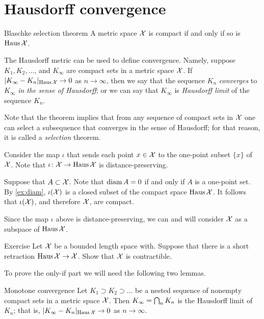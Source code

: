 \section{Hausdorff convergence}

\begin{thm}{Blaschke selection theorem}\label{thm:compact+Hausdorff}
A metric space $\mathcal{X}$ is compact if and only if
so is $\operatorname{\rm Haus}\nolimits\mathcal{X}$.
\end{thm}

The Hausdorff metric can be used to define convergence.
Namely, suppose $K_1,K_2,\dots$, and $K_\infty$ are compact sets in a metric space $\mathcal{X}$.
If $|K_\infty-K_n|_{\operatorname{\rm Haus}\nolimits\mathcal{X}}\to0$ as $n\to\infty$, then we say that 
the sequence $K_n$ {}\emph{converges} to $K_\infty$ \emph{in the sense of Hausdorff};
or we can say that $K_\infty$ is {}\emph{Hausdorff limit} of the sequence $K_n$.

Note that the theorem implies that from any sequence of compact sets in $\mathcal{X}$ one can select a subsequence that converges in the sense of Hausdorff; 
for that reason, it is called a \textit{selection} theorem. 

Consider the map $\iota$ that sends each point $x\in \mathcal{X}$ to the one-point subset $\{x\}$ of $\mathcal{X}$.
Note that $\iota\colon\mathcal{X}\to \operatorname{\rm Haus}\nolimits\mathcal{X}$ is distance-preserving.

Suppose that $A\subset \mathcal{X}$.
Note that $\operatorname{\rm diam}\nolimits A=0$ if and only if $A$ is a one-point set.
By \ref{ex:diam}, $\iota(\mathcal{X})$ is a closed subset of the compact space $\operatorname{\rm Haus}\nolimits\mathcal{X}$.
It follows that $\iota(\mathcal{X})$, and therefore $\mathcal{X}$, are compact.
\qeds

Since the map $\iota$ above is distance-preserving, we can and will consider $\mathcal{X}$ as a subspace of $\operatorname{\rm Haus}\nolimits\mathcal{X}$.

\begin{thm}{Exercise}\label{ex:haus-contractible}
Let $\mathcal{X}$ be a bounded length space with.
Suppose that there is a short retraction $\operatorname{\rm Haus}\nolimits\mathcal{X}\to \mathcal{X}$.
Show that $\mathcal{X}$ is contractible.
\end{thm}


To prove the only-if part we will need the following two lemmas.

\begin{thm}{Monotone convergence}\label{lem:decreasing-converges}
Let $K_1\supset K_2\supset\dots$ be a nested sequence of nonempty compact sets in a metric space $\mathcal{X}$.
Then $K_\infty\z=\bigcap_n K_n$ is the Hausdorff limit of $K_n$;
that is, $|K_\infty-K_n|_{\operatorname{\rm Haus}\nolimits\mathcal{X}}\to0$ as $n\to\infty$.
\end{thm}

